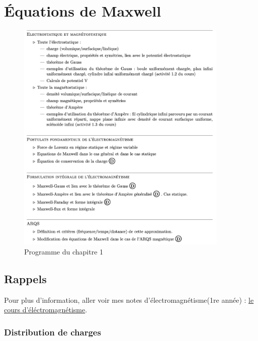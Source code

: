 \chapter{Équations de Maxwell}
\begin{tcolorbox}
   \begin{figure}[H] %
     \centering
     \includegraphics[width=0.9\textwidth]{./assets/Programme du chapitre 1.png}
     \caption{Programme du chapitre 1}
     \label{fig:Programme du chapitre 1}
   \end{figure}
\end{tcolorbox}

\newpage
\section{Rappels} %
\label{sec:Rappels}
Pour plus d'information, aller voir mes notes d'électromagnétisme(1re année) : \href{https://github.com/Languisher/CPGE-Notes/blob/main/Notes/Notes%20-%20Essentiels/ElectroMag.pdf}{le cours d'éléctromagnétisme}.

  \subsection{Distribution de charges} %
  \label{sub:Distribution de charges}
  
